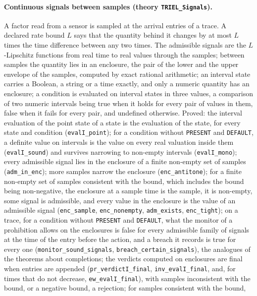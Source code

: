 \documentclass[11pt,a4paper]{article}
\begin{document}
\paragraph{Continuous signals between samples (theory \texttt{TRIEL\_Signals}).}
A factor read from a sensor is sampled at the arrival entries of a trace. A declared
rate bound $L$ says that the quantity behind it changes by at most $L$ times the time
difference between any two times. The admissible signals are the $L$-Lipschitz functions
from real time to real values through the samples; between samples the quantity lies in
an enclosure, the pair of the lower and the upper envelope of the samples, computed by
exact rational arithmetic; an interval state carries a Boolean, a string or a time
exactly, and only a numeric quantity has an enclosure; a condition is evaluated on
interval states in three values, a comparison of two numeric intervals being true when
it holds for every pair of values in them, false when it fails for every pair, and
undefined otherwise. Proved: the interval evaluation of the point state of a state is
the evaluation of the state, for every state and condition (\texttt{evalI\_point});
for a condition without \texttt{PRESENT} and \texttt{DEFAULT}, a definite value on intervals is the value on
every real valuation inside them (\texttt{evalI\_sound}) and survives narrowing to
non-empty intervals (\texttt{evalI\_mono}); every admissible signal lies in the
enclosure of a finite non-empty set of samples (\texttt{adm\_in\_enc}); more samples
narrow the enclosure (\texttt{enc\_antitone}); for a finite non-empty set of samples
consistent with the bound, which includes the bound being non-negative, the enclosure
at a sample time is the sample, it is non-empty, some signal is admissible, and every
value in the enclosure is the value of an admissible signal (\texttt{enc\_sample},
\texttt{enc\_nonempty}, \texttt{adm\_exists}, \texttt{enc\_tight}); on a trace, for a condition
without \texttt{PRESENT} and \texttt{DEFAULT}, what the monitor of a
prohibition allows on the enclosures is false for every admissible family of signals at
the time of the entry before the action, and a breach it records is true for every one
(\texttt{monitor\_sound\_signals}, \texttt{breach\_certain\_signals}), the
analogues of the theorems about completions; the verdicts computed on enclosures are
final when entries are appended (\texttt{pr\_verdictI\_final},
\texttt{inv\_evalI\_final}, and, for times that do not decrease,
\texttt{ew\_evalI\_final}), with samples inconsistent
with the bound, or a negative bound, a rejection; for samples consistent with the bound,
\end{document}

